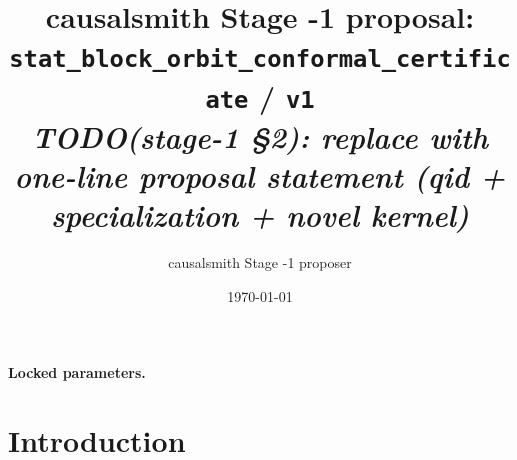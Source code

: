 \documentclass[11pt]{article}
\title{causalsmith Stage -1 proposal: \texttt{stat\_block\_orbit\_conformal\_certificate} / \texttt{v1}%
  \\ \large\textit{TODO(stage-1 \S2): replace with one-line proposal statement (qid + specialization + novel kernel)}}
\author{causalsmith Stage -1 proposer}
\date{\today}
\theoremstyle{definition}
\theoremstyle{plain}
\theoremstyle{remark}
\begin{document}
\maketitle


\paragraph{Locked parameters.}

\begin{abstract}
\end{abstract}

\section{Introduction}
%
%
%
%
\end{document}
